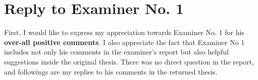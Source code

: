 \section*{Reply to Examiner No. 1}

\begin{replyheader}
\end{replyheader}  

First, I would like to express my appreciation towards Examiner No. 1 for his \textbf{over-all positive comments}.
I also appreciate the fact that Examiner No 1 includes
  not only his comments in the examiner's report
  but also helpful suggestions inside the original thesis.
There was no direct question in the report, and followings are my replies to his comments in the returned thesis.


